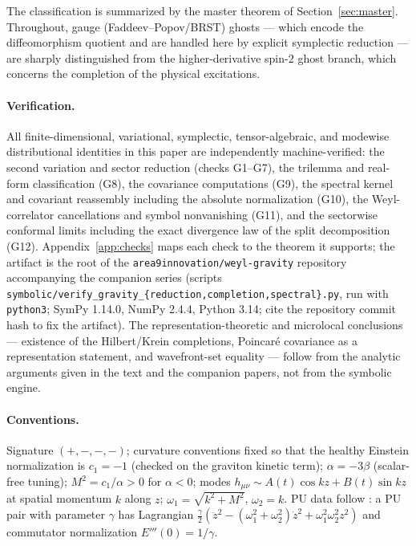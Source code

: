 \documentclass[11pt]{article}
\theoremstyle{definition}
\theoremstyle{remark}
\newcommand{\w}{\omega}
\begin{document}
The classification is summarized by the master theorem of
Section~\ref{sec:master}.  Throughout, gauge (Faddeev--Popov/BRST) ghosts
--- which encode the diffeomorphism quotient and are handled here by
explicit symplectic reduction --- are sharply distinguished from the
higher-derivative spin-$2$ ghost branch, which concerns the completion of
the physical excitations.

\paragraph{Verification.}
All finite-dimensional, variational, symplectic, tensor-algebraic, and
modewise distributional identities in this paper are independently
machine-verified: the second variation and sector reduction (checks
G1--G7), the trilemma and real-form classification (G8), the covariance
computations (G9), the spectral kernel and covariant reassembly including
the absolute normalization (G10), the Weyl-correlator cancellations and
symbol nonvanishing (G11), and the sectorwise conformal limits including
the exact divergence law of the split decomposition (G12).
Appendix~\ref{app:checks} maps each check to the theorem it supports;
the artifact is the root of the \texttt{area9innovation/weyl-gravity}
repository accompanying the companion series
\cite{companion1,companion2,companion3} (scripts
\texttt{symbolic/verify\_gravity\_\{reduction,completion,spectral\}.py},
run with \texttt{python3}; SymPy 1.14.0, NumPy 2.4.4, Python 3.14; cite
the repository commit hash to fix the artifact).  The
representation-theoretic and microlocal conclusions --- existence of the
Hilbert/Krein completions, Poincar\'e covariance as a representation
statement, and wavefront-set equality --- follow from the analytic
arguments given in the text and the companion papers, not from the
symbolic engine.

\paragraph{Conventions.}
Signature $(+,-,-,-)$; curvature conventions fixed so that the healthy
Einstein normalization is $c_1=-1$ (checked on the graviton kinetic term);
$\alpha=-3\beta$ (scalar-free tuning); $M^2=c_1/\alpha>0$ for $\alpha<0$;
modes $h_{\mu\nu}\sim A(t)\cos kz+B(t)\sin kz$ at spatial momentum $k$
along $z$; $\w_1=\sqrt{k^2+M^2}$, $\w_2=k$.  PU data follow
\cite{companion1,companion2}: a PU pair with parameter $\gamma$ has
Lagrangian $\tfrac{\gamma}{2}(\ddot z^2-(\w_1^2+\w_2^2)\dot
z^2+\w_1^2\w_2^2z^2)$ and commutator normalization $E'''(0)=1/\gamma$.
\end{document}
